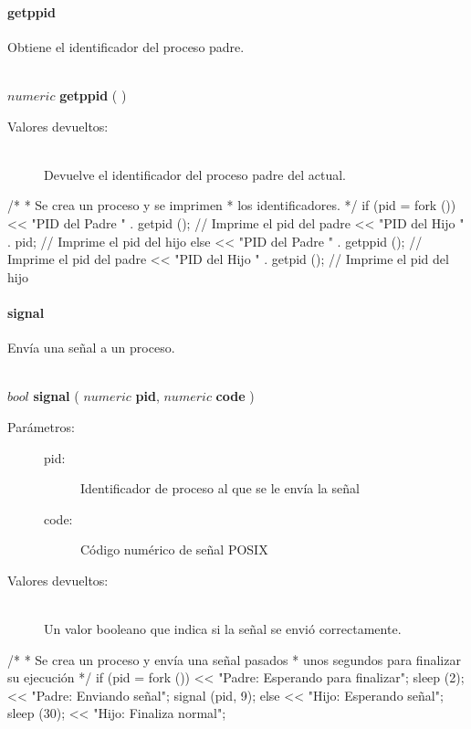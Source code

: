\paragraph{getppid}
Obtiene el identificador del proceso padre.


\begin{framed}
\hfill \\ $numeric$ \textbf{getppid} ( )  
\begin{description}
\item[Valores devueltos:] \hfill \\
   Devuelve el identificador del proceso padre del actual.
\end{description}
\end{framed}
     
\begin{myverbatim}  
   /*
    * Se crea un proceso y se imprimen
    * los identificadores.
    */
   if (pid = fork ()) {
      << "PID del Padre " . getpid (); // Imprime el pid del padre
      << "PID del Hijo " . pid; // Imprime el pid del hijo
   } else {
      << "PID del Padre " . getppid (); // Imprime el pid del padre
      << "PID del Hijo " . getpid (); // Imprime el pid del hijo
   }
\end{myverbatim}

\paragraph{signal}
Envía una señal a un proceso. 

\begin{framed}
\hfill \\ $bool$ \textbf{signal} ( $numeric$ \textbf{pid}, $numeric$ \textbf{code} )  
\begin{description}
\item [Parámetros:] \hfill 
   \begin{description}
   \item[pid:] Identificador de proceso al que se le envía la señal
   \item[code:] Código numérico de señal POSIX
   \end{description}
\item[Valores devueltos:] \hfill \\
   Un valor booleano que indica si la señal se envió correctamente. 
\end{description}
\end{framed}
     
\begin{myverbatim}  
   /*
    * Se crea un proceso y envía una señal pasados
    * unos segundos para finalizar su ejecución
    */
   if (pid = fork ()) {
      << "Padre: Esperando para finalizar";
      sleep (2);
      << "Padre: Enviando señal";
      signal (pid, 9);
   } else {
      << "Hijo: Esperando señal";
      sleep (30);
      << "Hijo: Finaliza normal";
   }
\end{myverbatim}

